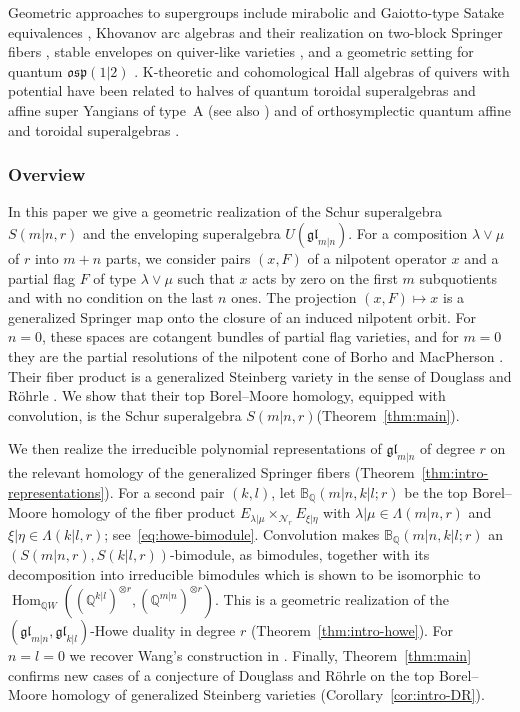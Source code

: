 \documentclass[11pt,a4paper]{amsart}
\theoremstyle{definition}
\theoremstyle{remark}
\newcommand{\Q}{\mathbb Q}
\newcommand{\N}{\mathcal N}
\newcommand{\bB}{\mathbb B}
\newcommand{\Hom}{\operatorname{Hom}}
\newcommand{\lm}{\lambda|\mu}
\newcommand{\xh}{\xi|\eta}
\numberwithin{equation}{section}
\begin{document}
Geometric approaches to supergroups include mirabolic and Gaiotto-type Satake equivalences \cite{BFGT,TY}, Khovanov arc algebras \cite{BS12} and their realization on two-block Springer fibers \cite{SW}, stable envelopes on quiver-like varieties \cite{RR}, and a geometric setting for quantum $\mathfrak{osp}(1|2)$ \cite{FL15}. K-theoretic and cohomological Hall algebras of quivers with potential have been related to halves of quantum toroidal superalgebras and affine super Yangians of type~A \cite{VV22,Neg25} (see also \cite{Tsy20,RSYZ23}) and of orthosymplectic quantum affine and toroidal superalgebras \cite{Neg26}.

\subsubsection{Overview}
\label{sec:overview}
In this paper we give a geometric realization of the Schur superalgebra $S(m|n,r)$ and the enveloping superalgebra $U(\mathfrak{gl}_{m|n})$. For a composition
$\lambda\vee\mu$ of $r$ into $m+n$ parts, we consider pairs $(x,F)$ of a
nilpotent operator $x$ and a partial flag $F$ of type $\lambda\vee\mu$
such that $x$ acts by zero on the first $m$ subquotients and with no
condition on the last $n$ ones. The projection $(x,F)\mapsto x$ is a
generalized Springer map onto the closure of an induced nilpotent orbit.
For $n=0$, these spaces are cotangent bundles of partial flag varieties,
and for $m=0$ they are the partial resolutions of the nilpotent cone of
Borho and MacPherson \cite{BM}. Their fiber product is a generalized Steinberg variety in the sense of Douglass and R\"ohrle \cite{DR04}.
We show that their top Borel--Moore homology, equipped with convolution, is the Schur superalgebra $S(m|n,r)$(Theorem~\ref{thm:main}).

We then realize the irreducible polynomial representations of
$\mathfrak{gl}_{m|n}$ of degree $r$ on the relevant homology of the generalized Springer fibers (Theorem~\ref{thm:intro-representations}). For a second pair $(k,l)$, let
$\bB_\Q(m|n,k|l;r)$ be the top Borel--Moore homology of the fiber product
$E_{\lm}\times_{\N_r}E_{\xh}$ with $\lm\in\Lambda(m|n,r)$ and
$\xh\in\Lambda(k|l,r)$; see~\eqref{eq:howe-bimodule}. Convolution makes
$\bB_\Q(m|n,k|l;r)$ an $(S(m|n,r),S(k|l,r))$-bimodule, 
as bimodules, together with its decomposition into irreducible
bimodules which is shown to be isomorphic to $\Hom_{\Q W}((\mathbb Q^{k|l})^{\otimes r},(\mathbb Q^{m|n})^{\otimes r})$. This is a geometric realization of the
$(\mathfrak{gl}_{m|n},\mathfrak{gl}_{k|l})$-Howe duality in degree $r$
(Theorem~\ref{thm:intro-howe}). For $n=l=0$ we recover Wang's
construction in \cite{Wan01}. Finally, Theorem~\ref{thm:main} confirms new cases of a conjecture of
Douglass and R\"ohrle \cite[Conjecture~3.19]{DRsurvey} on the top
Borel--Moore homology of generalized Steinberg varieties
(Corollary~\ref{cor:intro-DR}).
\end{document}
